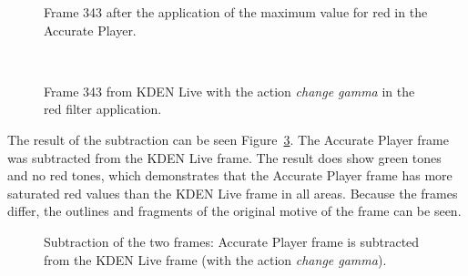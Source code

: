 \documentclass[../MasterThesis.tex]{subfiles}
\begin{document}
\begin{minipage}{0.48\textwidth}
	\begin{figure}[H]
		\begin{center}
			\caption[Frame 343 after the application of the red filter in the Accurate Player.]{Frame 343 after the application of the maximum value for red in the Accurate Player.}
			\label{figure:APframe1}
		\end{center}
	\end{figure}
\end{minipage}\begin{minipage}{0.04\textwidth}
	\ 
\end{minipage}\begin{minipage}{0.48\textwidth}
	\begin{figure}[H]
		\begin{center}
			\caption[Frame 343 from KDEN Live with the action \textit{change gamma}.]{Frame 343 from KDEN Live with the action \textit{change gamma} in the red filter application.}
			\label{figure:gamma}
		\end{center}
	\end{figure}
\end{minipage}

\vspace*{1.2em}

The result of the subtraction can be seen Figure~\ref{figure:gammagimp}. The Accurate Player frame was subtracted from the KDEN Live frame. The result does show green tones and no red tones, which demonstrates that the Accurate Player frame has more saturated red values than the KDEN Live frame in all areas. Because the frames differ, the outlines and fragments of the original motive of the frame can be seen.



\begin{figure}[H]
	\begin{center}
		\caption[Subtraction of KDEN Live (\textit{change gamma}) and Accurate Player.]{Subtraction of the two frames: Accurate Player frame is subtracted from the KDEN Live frame (with the action \textit{change gamma}).}
		\label{figure:gammagimp}
	\end{center}
\end{figure}
\end{document}
